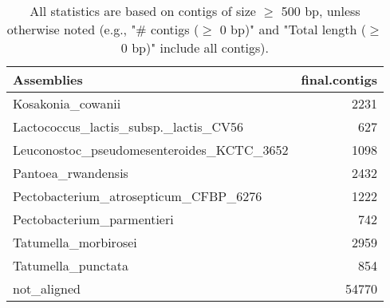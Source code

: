 \documentclass[12pt,a4paper]{article}
\begin{document}
\begin{table}[ht]
\begin{center}
\caption{All statistics are based on contigs of size $\geq$ 500 bp, unless otherwise noted (e.g., "\# contigs ($\geq$ 0 bp)" and "Total length ($\geq$ 0 bp)" include all contigs).}
\begin{tabular}{|l*{1}{|r}|}
\hline
Assemblies & final.contigs \\ \hline
Kosakonia\_cowanii & 2231 \\ \hline
Lactococcus\_lactis\_subsp.\_lactis\_CV56 & 627 \\ \hline
Leuconostoc\_pseudomesenteroides\_KCTC\_3652 & 1098 \\ \hline
Pantoea\_rwandensis & 2432 \\ \hline
Pectobacterium\_atrosepticum\_CFBP\_6276 & 1222 \\ \hline
Pectobacterium\_parmentieri & 742 \\ \hline
Tatumella\_morbirosei & 2959 \\ \hline
Tatumella\_punctata & 854 \\ \hline
not\_aligned & 54770 \\ \hline
\end{tabular}
\end{center}
\end{table}
\end{document}
